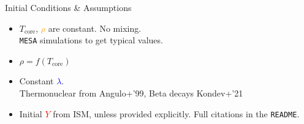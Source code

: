 \begin{frame}{Initial Conditions \& Assumptions}
\Large
    \begin{itemize}
        \item<1-> $T_\mathrm{core}$, \textcolor{orange}{$\rho$} are constant. No mixing. \\
        \texttt{MESA} simulations to get typical values. 
        \item<2-> $\rho = f(T_\mathrm{core})$
        \item<3-> Constant \textcolor{blue}{$\lambda$}.\\ Thermonuclear from Angulo+'99, Beta decays Kondev+'21
        \item<4-> Initial \textcolor{red}{$Y$} from ISM, unless provided explicitly. Full citations in the \texttt{README}.
    \end{itemize}
\end{frame}